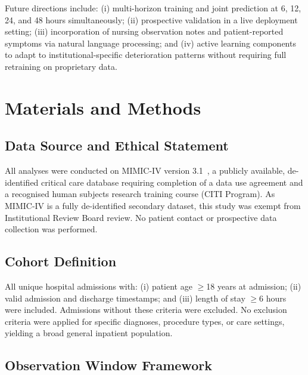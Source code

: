 \documentclass[12pt]{article}
\begin{document}
Future directions include: (i) multi-horizon training and joint prediction
at 6, 12, 24, and 48 hours simultaneously; (ii) prospective validation in a
live deployment setting; (iii) incorporation of nursing observation notes and
patient-reported symptoms via natural language processing; and (iv) active
learning components to adapt to institutional-specific deterioration patterns
without requiring full retraining on proprietary data.

\section*{Materials and Methods}

\subsection*{Data Source and Ethical Statement}

All analyses were conducted on MIMIC-IV version 3.1~\cite{johnson2023_mimic},
a publicly available, de-identified critical care database requiring completion
of a data use agreement and a recognised human subjects research training
course (CITI Program). As MIMIC-IV is a fully de-identified secondary dataset,
this study was exempt from Institutional Review Board review. No patient
contact or prospective data collection was performed.

\subsection*{Cohort Definition}

All unique hospital admissions with: (i) patient age $\geq$18 years at
admission; (ii) valid admission and discharge timestamps; and (iii) length of
stay $\geq$6 hours were included. Admissions without these criteria were
excluded. No exclusion criteria were applied for specific diagnoses, procedure
types, or care settings, yielding a broad general inpatient population.

\subsection*{Observation Window Framework}
\end{document}
